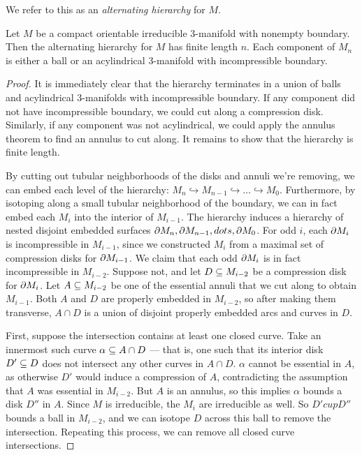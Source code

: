 \begin{defn}

We refer to this as an \emph{alternating hierarchy} for $M$.

\end{defn}

\begin{lemma}

Let $M$ be a compact orientable irreducible $3$-manifold with nonempty
boundary.  Then the alternating hierarchy for $M$ has finite length $n$. Each
component of $M_n$ is either a ball or an acylindrical $3$-manifold with
incompressible boundary.

\end{lemma}

\begin{proof}

It is immediately clear that the hierarchy terminates in a union of balls and
acylindrical $3$-manifolds with incompressible boundary. If any component did
not have incompressible boundary, we could cut along a compression disk.
Similarly, if any component was not acylindrical, we could apply the annulus
theorem to find an annulus to cut along. It remains to show that the hierarchy
is finite length.

By cutting out tubular neighborhoods of the disks and annuli we're removing, we
can embed each level of the hierarchy: $M_n \hookrightarrow M_{n-1}
\hookrightarrow \dots \hookrightarrow M_0$. Furthermore, by isotoping along
a small tubular neighborhood of the boundary, we can in fact embed each $M_i$
into the interior of $M_{i-1}$. The hierarchy induces a hierarchy of nested
disjoint embedded surfaces $\partial M_n, \partial M_{n-1}, dots, \partial M_0$. For odd $i$,
each $\partial M_i$ is incompressible in $M_{i-1}$, since we constructed $M_i$ from
a maximal set of compression disks for $\partial M_{i-1}$.  We claim that each odd
$\partial M_i$ is in fact incompressible in $M_{i-2}$.  Suppose not, and let $D \subseteq
M_{i-2}$ be a compression disk for $\partial M_i$. Let $A \subseteq M_{i-2}$ be one of
the essential annuli that we cut along to obtain $M_{i-1}$. Both $A$ and $D$
are properly embedded in $M_{i-2}$, so after making them transverse, $A \cap D$
is a union of disjoint properly embedded arcs and curves in $D$.

First, suppose the intersection contains at least one closed curve. Take an
innermost such curve $\alpha \subseteq A \cap D$ --- that is, one such that its
interior disk $D' \subseteq D$ does not intersect any other curves in $A \cap D$.
$\alpha$ cannot be essential in $A$, as otherwise $D'$ would induce
a compression of $A$, contradicting the assumption that $A$ was essential in
$M_{i-2}$.  But $A$ is an annulus, so this implies $\alpha$ bounds a disk $D''$
in $A$.  Since $M$ is irreducible, the $M_i$ are irreducible as well.  So $D'
cup D''$ bounds a ball in $M_{i-2}$, and we can isotope $D$ across this ball to
remove the intersection.  Repeating this process, we can remove all closed
curve intersections.


\end{proof}

